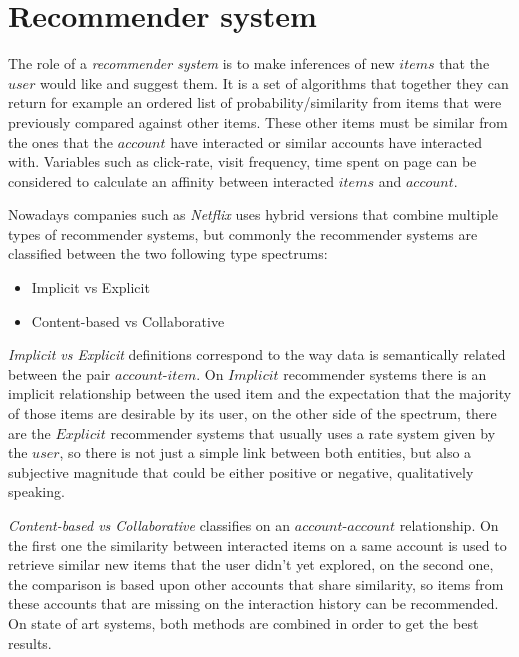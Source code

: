 \documentclass[ecp,tc,english]{iiufrgs}
\begin{document}
        \section{Recommender system}
        The role of a \textit{recommender system} is to make inferences of new \(items\) that the \(user\) would like and suggest them. It is a set of algorithms that together they can return for example an ordered list of probability/similarity from items that were previously compared against other items. These other items must be similar from the ones that the \(account\) have interacted or similar accounts have interacted with.
        Variables such as click-rate, visit frequency, time spent on page can be considered to calculate an affinity between interacted \(items\) and \(account\).

        Nowadays companies such as \textit{Netflix} uses hybrid versions that combine multiple types of recommender systems, but commonly the recommender systems are classified between the two following type spectrums:
        \begin{itemize} 
            \item Implicit vs Explicit
            \item Content-based vs Collaborative
        \end{itemize}

        \textit{Implicit vs Explicit} definitions correspond to the way data is semantically related between the pair \(account\)-\(item\). On \(Implicit\) recommender systems there is an implicit relationship between the used item and the expectation that the majority of those items are desirable by its user, on the other side of the spectrum, there are the \(Explicit\) recommender systems that usually uses a rate system given by the \(user\), so there is not just a simple link between both entities, but also a subjective magnitude that could be either positive or negative, qualitatively speaking.

        \textit{Content-based vs Collaborative} classifies on an \(account\)-\(account\) relationship. On the first one the similarity between interacted items on a same account is used to retrieve similar new items that the user didn't yet explored, on the second one, the comparison is based upon other accounts that share similarity, so items from these accounts that are missing on the interaction history can be recommended. On state of art systems, both methods are combined in order to get the best results.    
        
\end{document}
